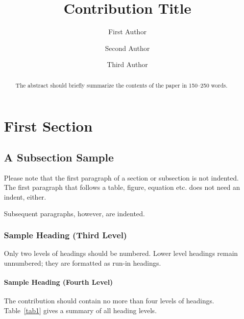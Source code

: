\documentclass[runningheads]{llncs}
\begin{document}
%
\title{Contribution Title}
%
%
\author{First Author \and
Second Author \and
Third Author}
%
%
%
\maketitle              %
%
\begin{abstract}
The abstract should briefly summarize the contents of the paper in
150--250 words.

\end{abstract}
%
%
%
\section{First Section}
\subsection{A Subsection Sample}
Please note that the first paragraph of a section or subsection is
not indented. The first paragraph that follows a table, figure,
equation etc. does not need an indent, either.

Subsequent paragraphs, however, are indented.

\subsubsection{Sample Heading (Third Level)} Only two levels of
headings should be numbered. Lower level headings remain unnumbered;
they are formatted as run-in headings.

\paragraph{Sample Heading (Fourth Level)}
The contribution should contain no more than four levels of
headings. Table~\ref{tab1} gives a summary of all heading levels.
\end{document}
